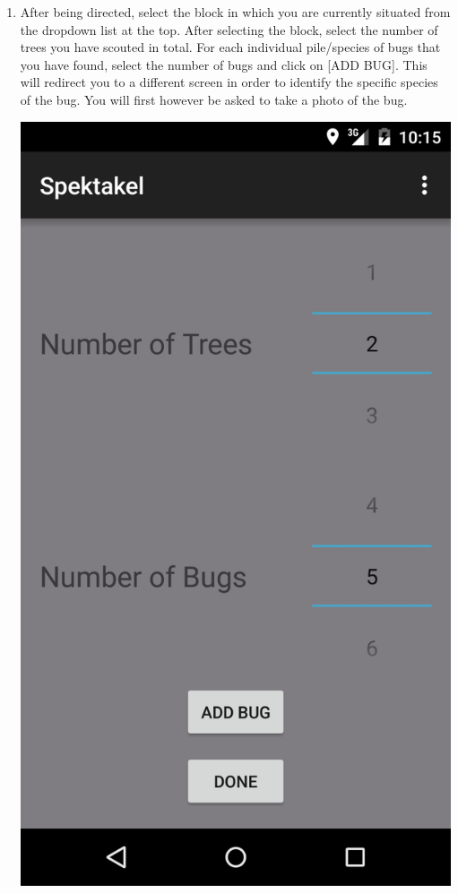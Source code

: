 \documentclass[11pt,a4paper,titlepage]{article}
\begin{document}
\begin{enumerate}
	\item After being directed, select the block in which you are currently situated from the dropdown list at the top. After selecting the block, select the number of trees you have scouted in total. For each individual pile/species of bugs that you have found, select the number of bugs and click on [ADD BUG]. This will redirect you to a different screen in order to identify the specific species of the bug. You will first however be asked to take a photo of the bug.
		\begin{center}
				\includegraphics[scale=0.13]{shot3}
			\end{center}


\end{enumerate}
\end{document}
